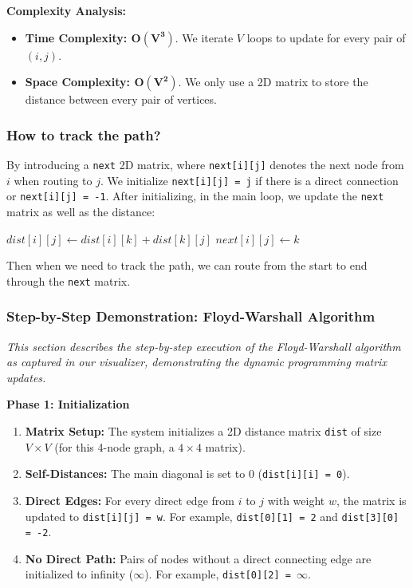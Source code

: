\textbf{Complexity Analysis:}

\begin{itemize}
    \item \textbf{Time Complexity: $\mathbf{O(V^3)}$}. We iterate $V$ loops to update for every pair of $(i, j)$.
    \item \textbf{Space Complexity: $\mathbf{O(V^2)}$}. We only use a 2D matrix to store the distance between every pair of vertices.
\end{itemize}

\subsubsection{How to track the path?}
By introducing a \texttt{next} 2D matrix, where \texttt{next[i][j]} denotes the next node from $i$ when routing to $j$. We initialize \texttt{next[i][j] = j} if there is a direct connection or \texttt{next[i][j] = -1}. After initializing, in the main loop, we update the \texttt{next} matrix as well as the distance:

\begin{algorithm}[H]
\begin{algorithmic}[1]
    \State $dist[i][j] \gets dist[i][k] + dist[k][j]$
    \State $next[i][j] \gets k$
\EndIf
\end{algorithmic}
\end{algorithm}
Then when we need to track the path, we can route from the start to end through the \texttt{next} matrix.
\subsubsection{Step-by-Step Demonstration: Floyd-Warshall Algorithm}
\textit{This section describes the step-by-step execution of the Floyd-Warshall algorithm as captured in our visualizer, demonstrating the dynamic programming matrix updates.}

\vspace{0.2cm}
\textbf{Phase 1: Initialization}
\begin{enumerate}
    \item \textbf{Matrix Setup:} The system initializes a 2D distance matrix \texttt{dist} of size $V \times V$ (for this 4-node graph, a $4 \times 4$ matrix).
    \item \textbf{Self-Distances:} The main diagonal is set to 0 (\texttt{dist[i][i] = 0}).
    \item \textbf{Direct Edges:} For every direct edge from $i$ to $j$ with weight $w$, the matrix is updated to \texttt{dist[i][j] = w}. For example, \texttt{dist[0][1] = 2} and \texttt{dist[3][0] = -2}.
    \item \textbf{No Direct Path:} Pairs of nodes without a direct connecting edge are initialized to infinity ($\infty$). For example, \texttt{dist[0][2] = $\infty$}.
\end{enumerate}

